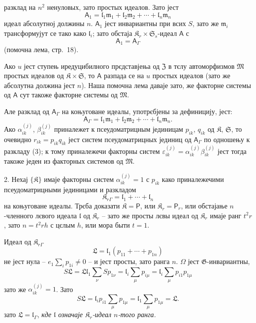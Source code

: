 \documentclass[11pt]{article}
\begin{document}
разклад на \(n^2\) ненуловых, зато простых идеалов. Зато јест
\[
\mathsf{A}_1=\mathfrak l_1\mathfrak m_1+\mathfrak l_2\mathfrak m_2+\cdots+\mathfrak l_n\mathfrak m_n
\]
идеал абсолутној должины \(n\). \(\mathsf{A}_1\) јест инвариантны при всих \(S\), зато же \(\mathfrak m_i\) трансформујут се тако како \(\mathfrak l_i\); зато обстаја \(\mathfrak K_r\times\mathfrak S_s\)-идеал \(\mathsf{A}\) с
\[
\mathsf{A}_1=\mathsf{A}_\Gamma
\]
(помочна лема, стр.~18).

Ако \(u\) јест ступењ иредуцибилного прєдставјења од \(\mathfrak Z\) в тєлу автоморфизмов \(\mathfrak M\) простых идеалов од \(\mathfrak K\times\mathfrak S\), то \(\mathsf{A}\) разпада се на \(u\) простых идеалов (зато же абсолутна должина јест \(n\)). Наша помочна лема даваје зато, же факторне системы од \(\mathsf{A}\) сут такоже факторне системы од \(\mathfrak M\).

Але разклад од \(\mathsf{A}_\Gamma\) на коњуговане идеалы, употрєбјены за дефиницију, јест:
\[
\tag{3}
\mathsf{A}_\Gamma=\mathfrak l_1\mathfrak m_1+\mathfrak l_2\mathfrak m_2+\cdots+\mathfrak l_n\mathfrak m_n.
\]
Ако \(\alpha_{ik}^{(j)}\), \(\beta_{ik}^{(j)}\) приналежет к псеудоматрицным јединицам \(p_{ik}\), \(q_{ik}\) од \(\mathfrak K\), \(\mathfrak S\), то очевидно \(r_{ik}=p_{ik}q_{ik}\) јест систем псеудоматрицных јединиц од \(\mathsf{A}_\Gamma\) по одношењу к разкладу (3); к тому приналежечи факторны систем \(\varepsilon_{ik}^{(j)}=\alpha_{ik}^{(j)}\beta_{ik}^{(j)}\) јест тогда такоже једен из факторных системов од \(\mathfrak M\).

2. Нехај \(\{\mathfrak K\}\) имаје факторны систем \(\alpha_{ik}^{(j)}=1\) с \(p_{ik}\) како приналежечими псеудоматрицными јединицами и разкладом
\[
\mathfrak K_{r\Gamma}=\mathfrak l_1+\cdots+\mathfrak l_n
\]
на коњуговане идеалы. Трєба доказати \(\mathfrak K=\mathsf P\), или \(\mathfrak K_r=\mathsf P_r\), или обстајање \(n\)-членного лєвого идеала \(\mathfrak l\) од \(\mathfrak K_r\) -- зато же просты лєвы идеал од \(\mathfrak K_r\) имаје ранг \(t^2r\), зато \(n=t^2rh\) с цєлым \(h\), или мора быти \(t=1\).

Идеал од \(\mathfrak K_{r\Gamma}\)
\[
\mathfrak L=\mathfrak l_1(p_{11}+\cdots+p_{1n})
\]
не јест нула -- \(e_1\sum_i p_{1i}\ne0\) -- и јест просты, зато ранга \(n\). \(\Omega\) јест \(\mathfrak G\)-инвариантны,
\[
S\mathfrak L
=\mathfrak L\mathfrak l_1\sum_\nu S p_{1\nu}
=\mathfrak l_i\sum_\mu p_{i\mu}
=\mathfrak l_i\sum_\mu p_{i1}p_{1\mu}
\]
зато же \(\alpha_{ik}^{(j)}=1\). Зато
\[
S\mathfrak L=\mathfrak l_ip_{i1}\sum_\mu p_{1\mu}
=\mathfrak l_1\sum_\mu p_{1\mu}
=\mathfrak L.
\]
зато \(\mathfrak L=\mathfrak l_\Gamma\), \emph{кде \(\mathfrak l\) означаје \(\mathfrak K_r\)-идеал \(n\)-того ранга.}
\end{document}
